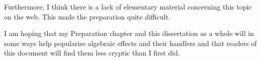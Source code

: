 \documentclass[class=article, crop=false]{standalone}
\begin{document}
Furthermore, I think there is a lack of elementary material concerning this topic on the web. This made the preparation
quite difficult. 

I am hoping that my Preparation chapter and this dissertation as a whole will in some ways help popularise algebraic effects
and their handlers and that readers of this document will find them less cryptic than I first did.
\end{document}
